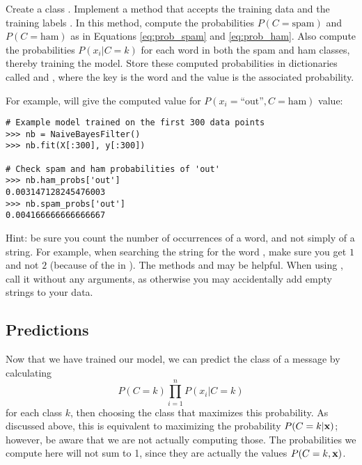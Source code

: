 \begin{problem}\label{prob:naivebayes:categorical-train}
Create a class .
Implement a method  that accepts the training data  and the training labels .
In this method, compute the probabilities $P(C=\text{spam})$ and $P(C=\text{ham})$ as in Equations \eqref{eq:prob_spam} and \eqref{eq:prob_ham}.
Also compute the probabilities $P(x_i|C=k)$ for each word in both the spam and ham classes, thereby training the model.
Store these computed probabilities in dictionaries called  and , where the key is the word and the value is the associated probability.

For example,  will give the computed value for $P(x_i=\text{``out''},C=\text{ham})$ value:
\begin{lstlisting}
# Example model trained on the first 300 data points
>>> nb = NaiveBayesFilter()
>>> nb.fit(X[:300], y[:300])

# Check spam and ham probabilities of 'out'
>>> nb.ham_probs['out']
0.003147128245476003
>>> nb.spam_probs['out']
0.004166666666666667
\end{lstlisting}

Hint: be sure you count the number of occurrences of a word, and not simply of a string. For example, when searching the string  for the word , make sure you get $1$ and not $2$ (because of the  in ).
The methods  and  may be helpful.
When using , call it without any arguments, as otherwise you may accidentally add empty strings to your data.
\end{problem}

\subsection*{Predictions}
Now that we have trained our model, we can predict the class of a message by calculating
\[
P(C=k)\prod_{i=1}^n P(x_i|C=k)
\]
for each class $k$, then choosing the class that maximizes this probability.
As discussed above, this is equivalent to maximizing the probability $P(C=k|\mathbf{x})$; however, be aware that we are not actually computing those.
The probabilities we compute here will not sum to 1, since they are actually the values $P(C=k,\mathbf{x})$.

